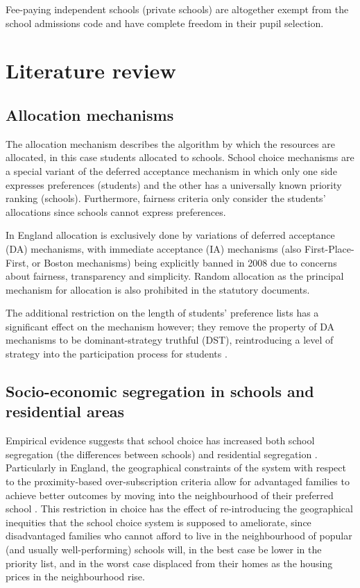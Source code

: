 \documentclass{article}
\begin{document}
\begin{multicols}{2}
Fee-paying independent schools (private schools) are altogether exempt from the school admissions code and have complete freedom in their pupil selection.

\section{Literature review}
\subsection{Allocation mechanisms}
The allocation mechanism describes the algorithm by which the resources are allocated, in this case students allocated to schools. School choice mechanisms are a special variant of the deferred acceptance mechanism in which only one side expresses preferences (students) and the other has a universally known priority ranking (schools). Furthermore, fairness criteria only consider the students' allocations since schools cannot express preferences. 

In England allocation is exclusively done by variations of deferred acceptance (DA) mechanisms, with immediate acceptance (IA) mechanisms (also First-Place-First, or Boston mechanisms) being explicitly banned in 2008 \cite{pathakSchoolAdmissionsReform2013}\cite{terrierImmediateAcceptanceDeferred} due to concerns about fairness, transparency and simplicity. Random allocation as the principal mechanism for allocation is also prohibited in the statutory documents.

The additional restriction on the length of students' preference lists has a significant effect on the mechanism however; they remove the property of DA mechanisms to be dominant-strategy truthful (DST), reintroducing a level of strategy into the participation process for students \cite{haeringerConstrainedSchoolChoice2009}. 

\subsection{Socio-economic segregation in schools and residential areas}
Empirical evidence suggests that school choice has increased both school segregation (the differences between schools) and residential segregation \cite{wilsonSchoolChoiceCity2019}. Particularly in England, the geographical constraints of the system with respect to the proximity-based over-subscription criteria allow for advantaged families to achieve better outcomes by moving into the neighbourhood of their preferred school \cite{burgessParentalChoicePrimary2011}\cite{burgessSchoolChoiceEngland2019}. This restriction in choice has the effect of re-introducing the geographical inequities that the school choice system is supposed to ameliorate, since disadvantaged families who cannot afford to live in the neighbourhood of popular (and usually well-performing) schools will, in the best case be lower in the priority list, and in the worst case displaced from their homes as the housing prices in the neighbourhood rise.


\end{multicols}
\end{document}
